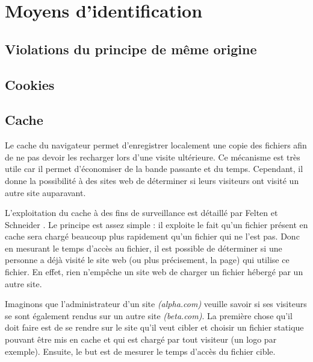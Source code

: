 \chapter{Moyens d'identification}
\section{Violations du principe de même origine}
\section{Cookies}
\section{Cache}
Le cache du navigateur permet d'enregistrer localement une copie des fichiers afin de ne pas devoir les recharger lors d'une visite ultérieure. Ce mécanisme est très utile car il permet d'économiser de la bande passante et du temps. Cependant, il donne la possibilité à des sites web de déterminer si leurs visiteurs ont visité un autre site auparavant.

L'exploitation du cache à des fins de surveillance est détaillé par Felten et Schneider \cite{Felten:2000:TAW:352600.352606}.
Le principe est assez simple : il exploite le fait qu'un fichier présent en cache sera chargé beaucoup plus rapidement qu'un fichier qui ne l'est pas. Donc en mesurant le temps d'accès au fichier, il est possible de déterminer si une personne a déjà visité le site web (ou plus précisement, la page) qui utilise ce fichier. En effet, rien n'empêche un site web de charger un fichier hébergé par un autre site.
\newline

Imaginons que l'administrateur d'un site \emph{(alpha.com)} veuille savoir si ses visiteurs se sont également rendus sur un autre site \emph{(beta.com)}. La première chose qu'il doit faire est de se rendre sur le site qu'il veut cibler et choisir un fichier statique pouvant être mis en cache et qui est chargé par tout visiteur (un logo par exemple). Ensuite, le but est de mesurer le temps d'accès du fichier cible.

